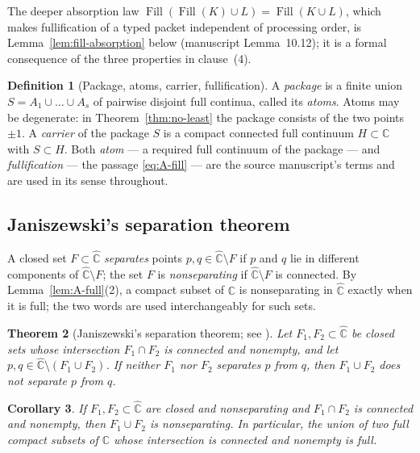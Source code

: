 \documentclass[11pt,reqno]{amsart}
\newtheorem{theorem}{Theorem}[section]
\newtheorem{corollary}[theorem]{Corollary}
\theoremstyle{definition}
\newtheorem{definition}[theorem]{Definition}
\theoremstyle{remark}
\newcommand{\C}{\mathbb C}
\newcommand{\Chat}{\widehat{\mathbb C}}
\newcommand{\Fill}{\operatorname{Fill}}
\begin{document}
The deeper absorption law
$\Fill(\Fill(K)\cup L)=\Fill(K\cup L)$, which makes fullification of a
typed packet independent of processing order, is
Lemma~\ref{lem:fill-absorption} below (manuscript Lemma~10.12); it is a
formal consequence of the three properties in clause~(4).

\begin{definition}[Package, atoms, carrier, fullification]
\label{def:A-package}
A \emph{package} is a finite union $S=A_1\cup\dots\cup A_s$ of pairwise
disjoint full continua, called its \emph{atoms}.  Atoms may be
degenerate: in Theorem~\ref{thm:no-least} the package consists of the two
points $\pm1$.  A \emph{carrier} of the package $S$ is a compact
connected full continuum $H\subset\C$ with $S\subset H$.  Both
\emph{atom} --- a required full continuum of the package --- and
\emph{fullification} --- the passage \eqref{eq:A-fill} --- are the source
manuscript's terms \cite{MWman} and are used in its sense throughout.
\end{definition}

\subsection{Janiszewski's separation theorem}\label{subsec:A-janiszewski}

A closed set $F\subset\Chat$ \emph{separates} points
$p,q\in\Chat\setminus F$ if $p$ and $q$ lie in different components of
$\Chat\setminus F$; the set $F$ is \emph{nonseparating} if
$\Chat\setminus F$ is connected.  By Lemma~\ref{lem:A-full}(2), a compact
subset of $\C$ is nonseparating in $\Chat$ exactly when it is full; the
two words are used interchangeably for such sets.

\begin{theorem}[Janiszewski's separation theorem; see \cite{New51,Why42}]
\label{thm:A-janiszewski}
Let $F_1,F_2\subset\Chat$ be closed sets whose intersection
$F_1\cap F_2$ is connected and nonempty, and let
$p,q\in\Chat\setminus(F_1\cup F_2)$.  If neither $F_1$ nor $F_2$
separates $p$ from $q$, then $F_1\cup F_2$ does not separate $p$ from
$q$.
\end{theorem}

\begin{corollary}\label{cor:A-janiszewski}
If $F_1,F_2\subset\Chat$ are closed and nonseparating and
$F_1\cap F_2$ is connected and nonempty, then $F_1\cup F_2$ is
nonseparating.  In particular, the union of two full compact subsets of
$\C$ whose intersection is connected and nonempty is full.
\end{corollary}
\end{document}
